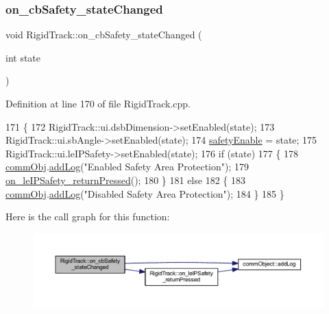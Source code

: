 \subsubsection{\texorpdfstring{on\+\_\+cb\+Safety\+\_\+state\+Changed}{on\_cbSafety\_stateChanged}}
{\footnotesize\ttfamily void Rigid\+Track\+::on\+\_\+cb\+Safety\+\_\+state\+Changed (\begin{DoxyParamCaption}\item[{int}]{state }\end{DoxyParamCaption})\hspace{0.3cm}{\ttfamily [slot]}}



Definition at line 170 of file Rigid\+Track.\+cpp.


\begin{DoxyCode}
171 \{
172     RigidTrack::ui.dsbDimension->setEnabled(state);
173     RigidTrack::ui.sbAngle->setEnabled(state);
174     \hyperlink{main_8cpp_aa6266eedab8b3c011be53baffbfc42ab}{safetyEnable} = state;
175     RigidTrack::ui.leIPSafety->setEnabled(state);
176     \textcolor{keywordflow}{if} (state)
177     \{
178         \hyperlink{main_8cpp_af29e7fc07ae0979d5fb61b473241d33d}{commObj}.\hyperlink{classcomm_object_aec354c7099b3039083cc4224e071e022}{addLog}(\textcolor{stringliteral}{"Enabled Safety Area Protection"});
179         \hyperlink{class_rigid_track_aa527ab3a2ddc7b31bf1063260efc9755}{on\_leIPSafety\_returnPressed}();
180     \}
181     \textcolor{keywordflow}{else}
182     \{
183         \hyperlink{main_8cpp_af29e7fc07ae0979d5fb61b473241d33d}{commObj}.\hyperlink{classcomm_object_aec354c7099b3039083cc4224e071e022}{addLog}(\textcolor{stringliteral}{"Disabled Safety Area Protection"});
184     \}
185 \}
\end{DoxyCode}
Here is the call graph for this function\+:
\nopagebreak
\begin{figure}[H]
\begin{center}
\leavevmode
\includegraphics[width=350pt]{class_rigid_track_a8f999fa968f4cc9fa548bdc8438b32c4_cgraph}
\end{center}
\end{figure}
\mbox{\label{class_rigid_track_ae5e44de9f4e3cacdd647c0305936b02b}} 
